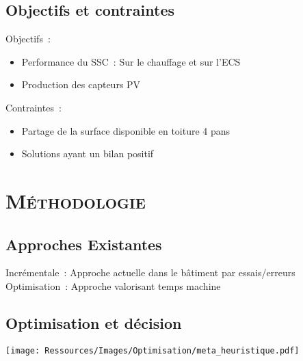 \documentclass[xcolor=x11names, compress, 11pt]{beamer}
\begin{document}
\subsection{Objectifs et contraintes}
\begin{frame}[c]
    \vfill
    Objectifs~:
    \begin{itemize}
        \item Performance du SSC~: Sur le chauffage et sur l’ECS
        \item Production des capteurs PV
    \end{itemize}
    \vfill
    Contraintes~:
    \begin{itemize}
        \item Partage de la surface disponible en toiture 4 pans
        \item Solutions ayant un bilan positif
    \end{itemize}

\end{frame}










\section{\scshape Méthodologie}



\subsection{Approches Existantes}
\begin{frame}[c]
    \vfill
     Incrémentale~: Approche actuelle dans le bâtiment par essais/erreurs
     Optimisation~: Approche valorisant temps machine
    \vfill

\end{frame}



\subsection{Optimisation et décision}
\begin{frame}[c]
    \vfill
    \centering
    \texttt{[image: Ressources/Images/Optimisation/meta\_heuristique.pdf]}
    \vfill
\end{frame}
\end{document}
